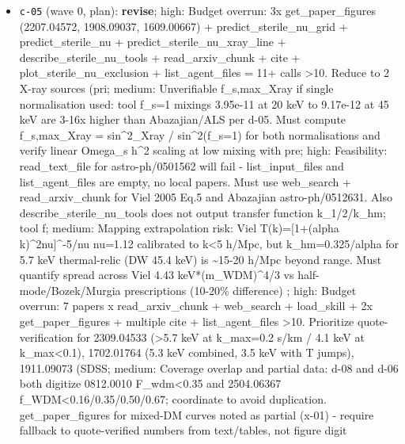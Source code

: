 \documentclass[11pt,a4paper]{article}
\begin{document}
\begin{itemize}
  \item \texttt{c-05} (wave 0, plan): \textbf{revise}; high: Budget overrun: 3x get\_paper\_figures (2207.04572, 1908.09037, 1609.00667) + predict\_sterile\_nu\_grid + predict\_sterile\_nu + predict\_sterile\_nu\_xray\_line + describe\_sterile\_nu\_tools + read\_arxiv\_chunk + cite + plot\_sterile\_nu\_exclusion + list\_agent\_files = 11+ calls \textgreater{}10. Reduce to 2 X-ray sources (pri; medium: Unverifiable f\_s,max\_Xray if single normalisation used: tool f\_s=1 mixings 3.95e-11 at 20 keV to 9.17e-12 at 45 keV are 3-16x higher than Abazajian/ALS per d-05. Must compute f\_s,max\_Xray = sin\textasciicircum{}2\_Xray / sin\textasciicircum{}2(f\_s=1) for both normalisations and verify linear Omega\_s h\textasciicircum{}2 scaling at low mixing with pre; high: Feasibility: read\_text\_file for astro-ph/0501562 will fail - list\_input\_files and list\_agent\_files are empty, no local papers. Must use web\_search + read\_arxiv\_chunk for Viel 2005 Eq.5 and Abazajian astro-ph/0512631. Also describe\_sterile\_nu\_tools does not output transfer function k\_1/2/k\_hm; tool f; medium: Mapping extrapolation risk: Viel T(k)=[1+(alpha k)\textasciicircum{}2nu]\textasciicircum{}-5/nu nu=1.12 calibrated to k\textless{}5 h/Mpc, but k\_hm=0.325/alpha for 5.7 keV thermal-relic (DW 45.4 keV) is \textasciitilde{}15-20 h/Mpc beyond range. Must quantify spread across Viel 4.43 keV*(m\_WDM)\textasciicircum{}4/3 vs half-mode/Bozek/Murgia prescriptions (10-20\% difference) ; high: Budget overrun: 7 papers x read\_arxiv\_chunk + web\_search + load\_skill + 2x get\_paper\_figures + multiple cite + list\_agent\_files \textgreater{}10. Prioritize quote-verification for 2309.04533 (\textgreater{}5.7 keV at k\_max=0.2 s/km / 4.1 keV at k\_max\textless{}0.1), 1702.01764 (5.3 keV combined, 3.5 keV with T jumps), 1911.09073 (SDSS; medium: Coverage overlap and partial data: d-08 and d-06 both digitize 0812.0010 F\_wdm\textless{}0.35 and 2504.06367 f\_WDM\textless{}0.16/0.35/0.50/0.67; coordinate to avoid duplication. get\_paper\_figures for mixed-DM curves noted as partial (x-01) - require fallback to quote-verified numbers from text/tables, not figure digit

\end{itemize}
\end{document}
